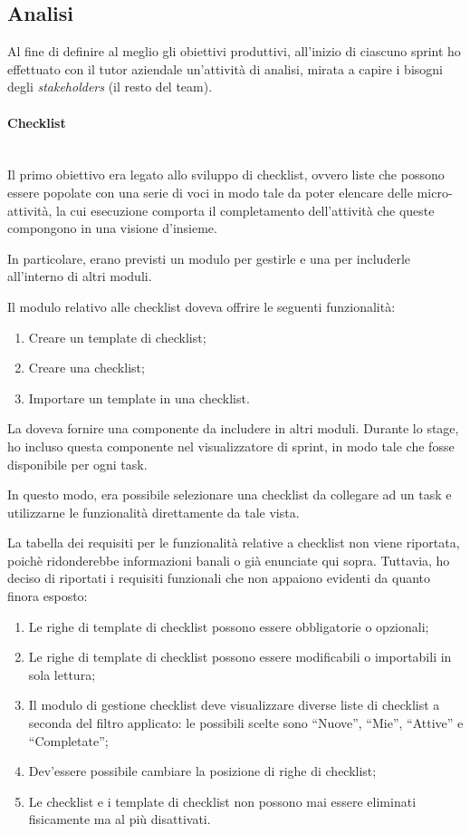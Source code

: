 \subsection{Analisi}

Al fine di definire al meglio gli obiettivi produttivi, all'inizio di ciascuno
sprint ho effettuato con il tutor aziendale un'attività di analisi, mirata a
capire i bisogni degli \emph{stakeholders} (il resto del team).

\paragraph{Checklist} \mbox{} \\

Il primo obiettivo era legato allo sviluppo di checklist, ovvero liste che
possono essere popolate con una serie di voci in modo tale da poter elencare
delle micro-attività, la cui esecuzione comporta il completamento
dell'attività che queste compongono in una visione d'insieme.

In particolare, erano previsti un modulo per gestirle e una 
per includerle all'interno di altri moduli.

Il modulo relativo alle checklist doveva offrire le seguenti funzionalità:

\begin{enumerate}
\item Creare un template di checklist;
\item Creare una checklist;
\item Importare un template in una checklist.
\end{enumerate}

La  doveva fornire una componente da includere in altri
moduli. Durante lo stage, ho incluso questa componente nel visualizzatore di
sprint, in modo tale che fosse disponibile per ogni task.

In questo modo, era possibile selezionare una checklist da collegare ad un
task e utilizzarne le funzionalità direttamente da tale vista.

La tabella dei requisiti per le funzionalità relative a checklist non viene
riportata, poichè ridonderebbe informazioni banali o già enunciate qui sopra.
Tuttavia, ho deciso di riportati i requisiti funzionali che non appaiono
evidenti da quanto finora esposto:

\begin{enumerate}
\item Le righe di template di checklist possono essere obbligatorie o
  opzionali;
\item Le righe di template di checklist possono essere modificabili o
  importabili in sola lettura;
\item Il modulo di gestione checklist deve visualizzare diverse liste di
  checklist a seconda del filtro applicato: le possibili scelte sono
  ``Nuove'', ``Mie'', ``Attive'' e ``Completate'';
\item Dev'essere possibile cambiare la posizione di righe di checklist;
\item Le checklist e i template di checklist non possono mai essere eliminati
  fisicamente ma al più disattivati.
\end{enumerate}

